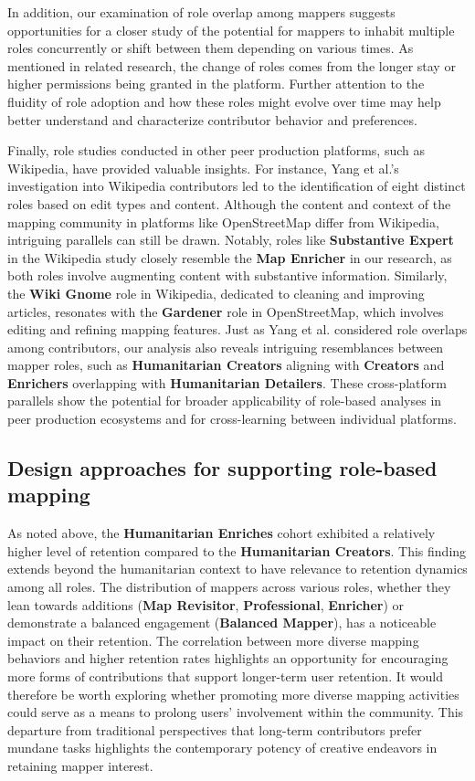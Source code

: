 \documentclass[manuscript,screen,review]{acmart}
\begin{document}
In addition, our examination of role overlap among mappers suggests opportunities for a closer study of the potential for mappers to inhabit multiple roles concurrently or shift between them depending on various times. 
As mentioned in related research, the change of roles comes from the longer stay \cite{BeginDR18} or higher permissions being granted \cite{Arazy15} in the platform. 
Further attention to the fluidity of role adoption and how these roles might evolve over time may help better understand and characterize contributor behavior and preferences. 

Finally, role studies conducted in other peer production platforms, such as Wikipedia, have provided valuable insights. 
For instance, Yang et al.'s\cite{Yang21} investigation into Wikipedia contributors led to the identification of eight distinct roles based on edit types and content. 
Although the content and context of the mapping community in platforms like OpenStreetMap differ from Wikipedia, intriguing parallels can still be drawn. 
Notably, roles like \textbf{Substantive Expert} in the Wikipedia study closely resemble the \textbf{Map Enricher} in our research, as both roles involve augmenting content with substantive information. 
Similarly, the \textbf{Wiki Gnome} role in Wikipedia, dedicated to cleaning and improving articles, resonates with the \textbf{Gardener} role in OpenStreetMap, which involves editing and refining mapping features. 
Just as Yang et al. considered role overlaps among contributors, our analysis also reveals intriguing resemblances between mapper roles, such as \textbf{Humanitarian Creators} aligning with \textbf{Creators} and \textbf{Enrichers} overlapping with \textbf{Humanitarian Detailers}. 
These cross-platform parallels show the potential for broader applicability of role-based analyses in peer production ecosystems and for cross-learning between individual platforms.

\subsection{Design approaches for supporting role-based mapping}

As noted above, the \textbf{Humanitarian Enriches} cohort exhibited a relatively higher level of retention compared to the \textbf{Humanitarian Creators}. This finding extends beyond the humanitarian context to have relevance to retention dynamics among all roles. The distribution of mappers across various roles, whether they lean towards additions (\textbf{Map Revisitor}, \textbf{Professional}, \textbf{Enricher}) or demonstrate a balanced engagement (\textbf{Balanced Mapper}), has a noticeable impact on their retention. The correlation between more diverse mapping behaviors and higher retention rates highlights an opportunity for encouraging more forms of contributions that support longer-term user retention. It would therefore be worth exploring whether promoting more diverse mapping activities could serve as a means to prolong users' involvement within the community. This departure from traditional perspectives that long-term contributors prefer mundane tasks\cite{shah_2006} highlights the contemporary potency of creative endeavors in retaining mapper interest. 
\end{document}
